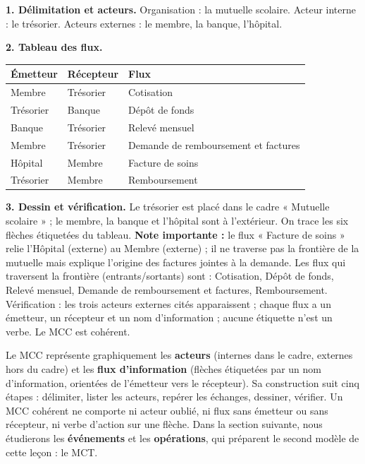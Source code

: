 \documentclass[11pt]{article}
\newcommand{\cle}[1]{{\popxbold\color{popdark}#1}}
\begin{document}
\begin{corrige}
\textbf{1. Délimitation et acteurs.} Organisation : la mutuelle scolaire. Acteur interne : le trésorier. Acteurs externes : le membre, la banque, l'hôpital.

\textbf{2. Tableau des flux.}

\begin{center}
\begin{tabularx}{\linewidth}{|l|l|X|}
\hline
\rowcolor{popblueL} \textbf{Émetteur} & \textbf{Récepteur} & \textbf{Flux} \\
\hline
Membre & Trésorier & Cotisation \\
\hline
Trésorier & Banque & Dépôt de fonds \\
\hline
Banque & Trésorier & Relevé mensuel \\
\hline
Membre & Trésorier & Demande de remboursement et factures \\
\hline
Hôpital & Membre & Facture de soins \\
\hline
Trésorier & Membre & Remboursement \\
\hline
\end{tabularx}
\end{center}

\textbf{3. Dessin et vérification.} Le trésorier est placé dans le cadre « Mutuelle scolaire » ; le membre, la banque et l'hôpital sont à l'extérieur. On trace les six flèches étiquetées du tableau. 
\textbf{Note importante :} le flux « Facture de soins » relie l'Hôpital (externe) au Membre (externe) ; il ne traverse pas la frontière de la mutuelle mais explique l'origine des factures jointes à la demande. Les flux qui traversent la frontière (entrants/sortants) sont : Cotisation, Dépôt de fonds, Relevé mensuel, Demande de remboursement et factures, Remboursement. Vérification : les trois acteurs externes cités apparaissent ; chaque flux a un émetteur, un récepteur et un nom d'information ; aucune étiquette n'est un verbe. Le MCC est cohérent.
\end{corrige}

\begin{aretenir}
Le \cle{MCC} représente graphiquement les \textbf{acteurs} (internes dans le cadre, externes hors du cadre) et les \textbf{flux d'information} (flèches étiquetées par un nom d'information, orientées de l'émetteur vers le récepteur). Sa construction suit cinq étapes : délimiter, lister les acteurs, repérer les échanges, dessiner, vérifier. Un MCC cohérent ne comporte ni acteur oublié, ni flux sans émetteur ou sans récepteur, ni verbe d'action sur une flèche. Dans la section suivante, nous étudierons les \textbf{événements} et les \textbf{opérations}, qui préparent le second modèle de cette leçon : le MCT.
\end{aretenir}
\end{document}
